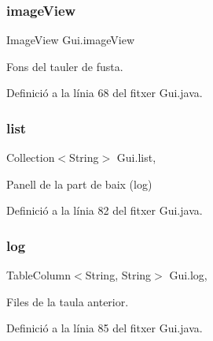\mbox{\label{class_gui_afdcd258194a961c45a4bf50d67cc3486}} 
\subsubsection{\texorpdfstring{image\+View}{imageView}}
{\footnotesize\ttfamily Image\+View Gui.\+image\+View\hspace{0.3cm}{\ttfamily [private]}}



Fons del tauler de fusta. 



Definició a la línia 68 del fitxer Gui.\+java.

\mbox{\label{class_gui_a96cd26aa3620f84f675a677f50ab41ac}} 
\subsubsection{\texorpdfstring{list}{list}}
{\footnotesize\ttfamily Collection$<$String$>$ Gui.\+list\hspace{0.3cm}{\ttfamily [static]}, {\ttfamily [private]}}



Panell de la part de baix (log) 



Definició a la línia 82 del fitxer Gui.\+java.

\mbox{\label{class_gui_aa2adf41c77e0946975bc9107dd5712f6}} 
\subsubsection{\texorpdfstring{log}{log}}
{\footnotesize\ttfamily Table\+Column$<$String, String$>$ Gui.\+log\hspace{0.3cm}{\ttfamily [static]}, {\ttfamily [private]}}



Files de la taula anterior. 



Definició a la línia 85 del fitxer Gui.\+java.

\mbox{\label{class_gui_adc1aff892600f520ce657dbf0d50d641}} 
